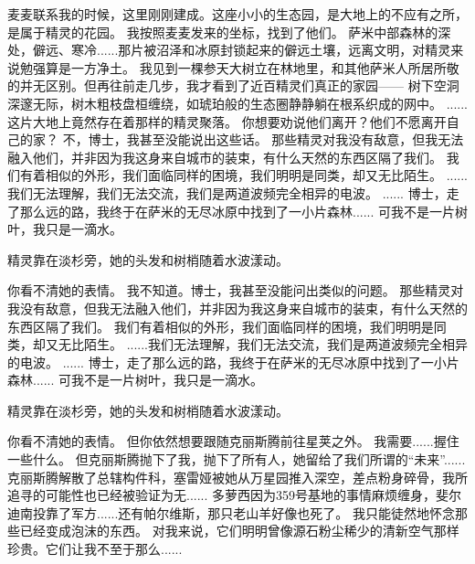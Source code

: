 \documentclass[openany]{book}
\begin{document}
\begin{dialogue}
     麦麦联系我的时候，这里刚刚建成。这座小小的生态园，是大地上的不应有之所，是属于精灵的花园。
     我按照麦麦发来的坐标，找到了他们。
     萨米中部森林的深处，僻远、寒冷......那片被沼泽和冰原封锁起来的僻远土壤，远离文明，对精灵来说勉强算是一方净土。
     我见到一棵参天大树立在林地里，和其他萨米人所居所敬的并无区别。但再往前走几步，我才看到了近百精灵们真正的家园——
     树下空洞深邃无际，树木粗枝盘桓缠绕，如琥珀般的生态圈静静躺在根系织成的网中。
     ......这片大地上竟然存在着那样的精灵聚落。
     你想要劝说他们离开？他们不愿离开自己的家？
     不，博士，我甚至没能说出这些话。
     那些精灵对我没有敌意，但我无法融入他们，并非因为我这身来自城市的装束，有什么天然的东西区隔了我们。
     我们有着相似的外形，我们面临同样的困境，我们明明是同类，却又无比陌生。
     ......我们无法理解，我们无法交流，我们是两道波频完全相异的电波。
     ......
     博士，走了那么远的路，我终于在萨米的无尽冰原中找到了一小片森林......
     可我不是一片树叶，我只是一滴水。\par
    精灵靠在淡杉旁，她的头发和树梢随着水波漾动。\par
    你看不清她的表情。
     我不知道。博士，我甚至没能问出类似的问题。
     那些精灵对我没有敌意，但我无法融入他们，并非因为我这身来自城市的装束，有什么天然的东西区隔了我们。
     我们有着相似的外形，我们面临同样的困境，我们明明是同类，却又无比陌生。
     ......我们无法理解，我们无法交流，我们是两道波频完全相异的电波。
     ......
     博士，走了那么远的路，我终于在萨米的无尽冰原中找到了一小片森林......
     可我不是一片树叶，我只是一滴水。\par
    精灵靠在淡杉旁，她的头发和树梢随着水波漾动。\par
    你看不清她的表情。
     但你依然想要跟随克丽斯腾前往星荚之外。
     我需要......握住一些什么。
     但克丽斯腾抛下了我，抛下了所有人，她留给了我们所谓的“未来”......
     克丽斯腾解散了总辖构件科，塞雷娅被她从万星园推入深空，差点粉身碎骨，我所追寻的可能性也已经被验证为无......
     多萝西因为359号基地的事情麻烦缠身，斐尔迪南投靠了军方......还有帕尔维斯，那只老山羊好像也死了。
     我只能徒然地怀念那些已经变成泡沫的东西。
     对我来说，它们明明曾像源石粉尘稀少的清新空气那样珍贵。它们让我不至于那么......

\end{dialogue}
\end{document}

